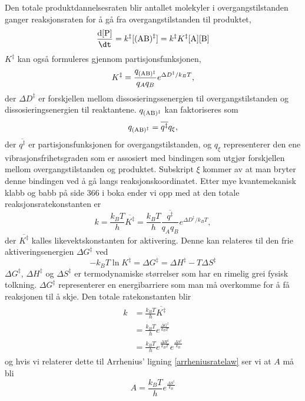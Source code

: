 Den totale produktdannelsesraten blir antallet molekyler i overgangstilstanden ganger reaksjonsraten for å gå fra overgangstilstanden til produktet,
\begin{equation}
	\frac{\text{d}\ce{[P]}}{\dt}=k^\ddag[\ce{(AB)^\ddag}]=k^\ddag K^\ddag \ce{[A][B]}
\end{equation}
$K^\ddag$ kan også formuleres gjennom partisjonsfunksjonen,
\begin{equation}
	K^\ddag=\frac{q_{\ce{(AB)^\ddag}}}{q_Aq_B}e^{\Delta D^\ddag / k_BT},
\end{equation}
der $\Delta D^\ddag$ er forskjellen mellom dissosieringssenergien til overgangstilstanden og dissosieringsenergien til reaktantene. $q_{\ce{(AB)^\ddag}}$ kan faktoriseres som
\begin{equation}
	q_{\ce{(AB)^\ddag}} = \overline{q^\ddag}q_\xi,
\end{equation}
der $\overline{q^\ddag}$ er partisjonsfunksjonen for overgangstilstanden, og $q_\xi$ representerer den ene vibrasjonsfrihetsgraden som er assosiert med bindingen som utgjør forskjellen mellom overgangstilstanden og produktet. Subskript $\xi$ kommer av at man bryter denne bindingen ved å gå langs reaksjonskoordinatet. Etter mye kvantemekanisk klabb og babb på side 366 i boka ender vi opp med at den totale reaksjonsratekonstanten er
\begin{equation}
\label{horrible}
	k=\frac{k_BT}{h}\overline{K^\ddag}=\frac{k_BT}{h}\frac{\overline{q^\ddag}}{q_Aq_B}e^{\Delta D^\ddag/k_BT},
\end{equation}
der $\overline{K^\ddag}$ kalles likevektskonstanten for aktivering. Denne kan relateres til den frie aktiveringsenergien $\Delta G^\ddag$ ved
\begin{equation}
	-k_BT\ln K^\ddag = \Delta G^\ddag = \Delta H^\ddag - T\Delta S^\ddag
\end{equation}
$\Delta G^\ddag$, $\Delta H^\ddag$ og $\Delta S^\ddag$ er termodynamiske størrelser som har en rimelig grei fysisk tolkning. $\Delta G^\ddag$ representerer en energibarriere som man må overkomme for å få reaksjonen til å skje. Den totale ratekonstanten blir
\begin{align}
\begin{split}
	k&=\frac{k_BT}{h}\overline{K^\ddag}\\
	&=\frac{k_BT}{h}e^{\frac{\Delta G^\ddag}{k_BT}}\\
	&=\frac{k_BT}{h}e^{\frac{\Delta H^\ddag}{k_BT}}e^{\frac{\Delta S^\ddag}{k_B}}
\end{split}
\end{align}
og hvis vi relaterer dette til Arrhenius' ligning \eqref{arrheniusratelaw} ser vi at $A$ må bli
\begin{equation}
	A=\frac{k_BT}{h}e^{\frac{\Delta S^\ddag}{k_B}}
\end{equation}

